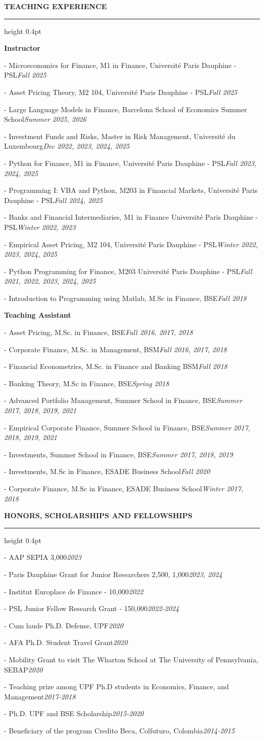 \documentclass[11pt,letterpaper]{article}
\makeatletter
\newcommand{\cvsection}[1]{%
  \par\vspace{12.80pt}%
  \textbf{#1}\par\nobreak
  \vspace{6.08pt}\hrule height 0.4pt\nobreak\vspace{6.9pt}\nobreak}
\newenvironment{cvbody}
  {\begin{list}{}{%
      \@beginparpenalty\@M      %
      \setlength{\leftmargin}{1.5em}%
      \setlength{\rightmargin}{0pt}%
      \setlength{\labelwidth}{0pt}%
      \setlength{\labelsep}{0pt}%
      \setlength{\listparindent}{0pt}%
      \setlength{\itemindent}{0pt}%
      \setlength{\topsep}{0pt}%
      \setlength{\partopsep}{0pt}%
      \setlength{\parsep}{0pt}%
      \setlength{\itemsep}{0pt}}%
   \item\relax}
  {\end{list}}
\newcommand{\dated}[2]{#1\hfill\textit{#2}\par}
\newcommand{\cvgap}{\vspace{\baselineskip}}
\makeatother
\begin{document}
\cvsection{TEACHING EXPERIENCE}
\begin{cvbody}
\textbf{Instructor}\par
\dated{- Microeconomics for Finance, M1 in Finance, Université Paris Dauphine - PSL}{Fall 2025}
\dated{- Asset Pricing Theory, M2 104, Université Paris Dauphine - PSL}{Fall 2025}
\dated{- Large Language Models in Finance, Barcelona School of Economics Summer School}{Summer 2025, 2026}
\dated{- Investment Funds and Risks, Master in Risk Management, Université du Luxembourg}{Dec 2022, 2023, 2024, 2025}
\dated{- Python for Finance, M1 in Finance, Université Paris Dauphine - PSL}{Fall 2023, 2024, 2025}
\dated{- Programming I: VBA and Python, M203 in Financial Markets, Université Paris Dauphine - PSL}{Fall 2024, 2025}
\dated{- Banks and Financial Intermediaries, M1 in Finance Université Paris Dauphine - PSL}{Winter 2022, 2023}
\dated{- Empirical Asset Pricing, M2 104, Université Paris Dauphine - PSL}{Winter 2022, 2023, 2024, 2025}
\dated{- Python Programming for Finance, M203 Université Paris Dauphine - PSL}{Fall 2021, 2022, 2023, 2024, 2025}
\dated{- Introduction to Programming using Matlab, M.Sc in Finance, BSE}{Fall 2018}
\cvgap
\textbf{Teaching Assistant}\par
\dated{- Asset Pricing, M.Sc. in Finance, BSE}{Fall 2016, 2017, 2018}
\dated{- Corporate Finance, M.Sc. in Management, BSM}{Fall 2016, 2017, 2018}
\dated{- Financial Econometrics, M.Sc. in Finance and Banking BSM}{Fall 2018}
\dated{- Banking Theory, M.Sc in Finance, BSE}{Spring 2018}
\dated{- Advanced Portfolio Management, Summer School in Finance, BSE}{Summer 2017, 2018, 2019, 2021}
\dated{- Empirical Corporate Finance, Summer School in Finance, BSE}{Summer 2017, 2018, 2019, 2021}
\dated{- Investments, Summer School in Finance, BSE}{Summer 2017, 2018, 2019}
\dated{- Investments, M.Sc in Finance, ESADE Business School}{Fall 2020}
\dated{- Corporate Finance, M.Sc in Finance, ESADE Business School}{Winter 2017, 2018}
\end{cvbody}

\cvsection{HONORS, SCHOLARSHIPS AND FELLOWSHIPS}
\begin{cvbody}
\dated{- AAP SEPIA \texteuro{}3,000}{2023}
\dated{- Paris Dauphine Grant for Junior Researchers \texteuro{}2,500, \texteuro{}1,000}{2023, 2024}
\dated{- Institut Europlace de Finance - \texteuro{}10,000}{2022}
\dated{- PSL Junior Fellow Research Grant - \texteuro{}150,000}{2022-2024}
\dated{- Cum laude Ph.D. Defense, UPF}{2020}
\dated{- AFA Ph.D. Student Travel Grant}{2020}
\dated{- Mobility Grant to visit The Wharton School at The University of Pennsylvania, SEBAP}{2020}
\dated{- Teaching prize among UPF Ph.D students in Economics, Finance, and Management}{2017-2018}
\dated{- Ph.D. UPF and BSE Scholarship}{2015-2020}
\dated{- Beneficiary of the program Credito Beca, Colfuturo, Colombia}{2014-2015}
\end{cvbody}
\end{document}
